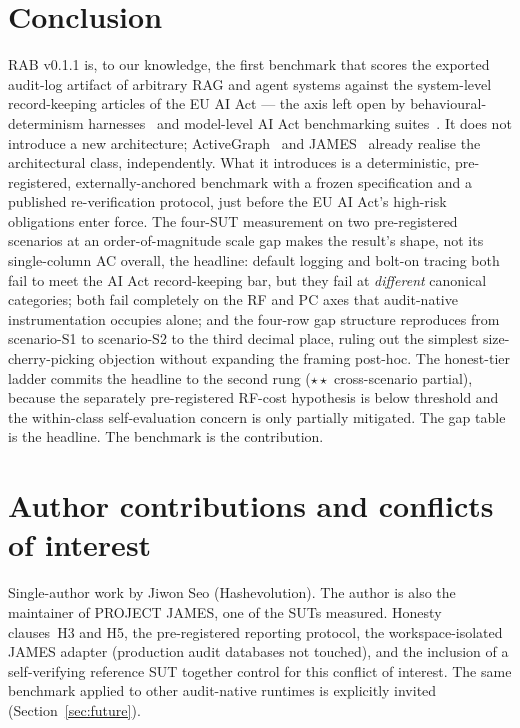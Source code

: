 \documentclass[11pt,a4paper]{article}
\begin{document}
\section{Conclusion}

RAB v0.1.1 is, to our knowledge, the first benchmark that scores the exported audit-log artifact of arbitrary RAG and agent systems against the system-level record-keeping articles of the EU AI Act --- the axis left open by behavioural-determinism harnesses~\cite{khatchadourian2026dfah} and model-level AI Act benchmarking suites~\cite{guldimann2024complai}. It does not introduce a new architecture; ActiveGraph~\cite{nakajima2026activegraph} and JAMES~\cite{seo2026jamesv043} already realise the architectural class, independently. What it introduces is a deterministic, pre-registered, externally-anchored benchmark with a frozen specification and a published re-verification protocol, just before the EU AI Act's high-risk obligations enter force. The four-SUT measurement on two pre-registered scenarios at an order-of-magnitude scale gap makes the result's shape, not its single-column AC overall, the headline: default logging and bolt-on tracing both fail to meet the AI Act record-keeping bar, but they fail at \emph{different} canonical categories; both fail completely on the RF and PC axes that audit-native instrumentation occupies alone; and the four-row gap structure reproduces from scenario-S1 to scenario-S2 to the third decimal place, ruling out the simplest size-cherry-picking objection without expanding the framing post-hoc. The honest-tier ladder commits the headline to the second rung ($\star\star$ cross-scenario partial), because the separately pre-registered RF-cost hypothesis is below threshold and the within-class self-evaluation concern is only partially mitigated. The gap table is the headline. The benchmark is the contribution.

\section*{Author contributions and conflicts of interest}
Single-author work by Jiwon Seo (Hashevolution). The author is also the maintainer of PROJECT JAMES, one of the SUTs measured. Honesty clauses~H3 and H5, the pre-registered reporting protocol, the workspace-isolated JAMES adapter (production audit databases not touched), and the inclusion of a self-verifying reference SUT together control for this conflict of interest. The same benchmark applied to other audit-native runtimes is explicitly invited (Section~\ref{sec:future}).
\end{document}

